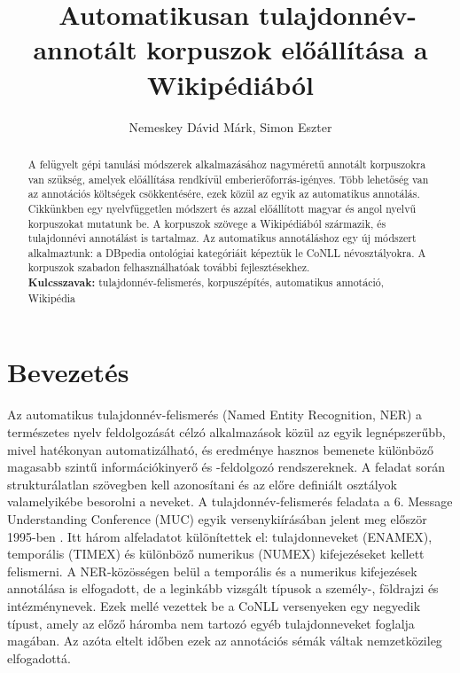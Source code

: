 \documentclass{llncs}
\begin{document}
\pagestyle{myheadings}
\def\leftmark{{\rm IX. Magyar Sz\'am\'\i t\'og\'epes Nyelv\'eszeti Konferencia}}
\def\rightmark{{\rm Szeged, 2013. január 7-8.}}

\setcounter{page}{3}

\title{\ \break Automatikusan tulajdonnév-annotált korpuszok előállítása a Wikipédiából}
\author{Nemeskey Dávid Márk, Simon Eszter}

\maketitle

\begin{abstract}
A felügyelt gépi tanulási módszerek alkalmazásához nagyméretű annotált korpuszokra van szükség, amelyek előállítása rendkívül emberierőforrás-igényes. Több lehetőség van az annotációs költségek csökkentésére, ezek közül az egyik az automatikus annotálás. Cikkünkben egy nyelvfüggetlen módszert és azzal előállított magyar és angol nyelvű korpuszokat mutatunk be. A korpuszok szövege a Wikipédiából származik, és tulajdonnévi annotálást is tartalmaz. Az automatikus annotáláshoz egy új módszert alkalmaztunk: a DBpedia ontológiai kategóriáit képeztük le CoNLL névosztályokra. A korpuszok szabadon felhasználhatóak további fejlesztésekhez.
\\[2mm]
{\bf Kulcsszavak:} tulajdonnév-felismerés, korpuszépítés,
automatikus annotáció, Wikipédia
\end{abstract}

\section{Bevezet\'es}

Az automatikus tulajdonnév-felismerés (Named Entity Recognition, NER) a természetes nyelv feldolgozását célzó alkalmazások közül az egyik legnépszerűbb, mivel hatékonyan automatizálható, és eredménye hasznos bemenete különböző magasabb szintű információkinyerő és -feldolgozó rendszereknek. A feladat során strukturálatlan szövegben kell azonosítani és az előre definiált osztályok valamelyikébe besorolni a neveket. A tulajdonnév-felismerés feladata a 6. Message Understanding Conference (MUC) egyik versenykiírásában jelent meg először 1995-ben \cite{MUC6}. Itt három alfeladatot különítettek el: tulajdonneveket (ENAMEX), temporális (TIMEX) és különböző numerikus (NUMEX) kifejezéseket kellett felismerni. A NER-közösségen belül a temporális és a numerikus kifejezések annotálása is elfogadott, de a leginkább vizsgált típusok a személy-, földrajzi és intézménynevek. Ezek mellé vezettek be a CoNLL versenyeken \cite{tksintro2002conll} \cite{conll2003intro} egy negyedik típust, amely az előző háromba nem tartozó egyéb tulajdonneveket foglalja magában. Az azóta eltelt időben ezek az annotációs sémák váltak nemzetközileg elfogadottá. 
\end{document}
